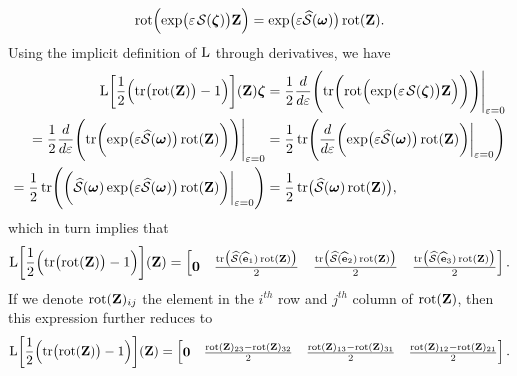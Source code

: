 \begin{align}
    \rot\Bigl(\exp\bigl(\varepsilon\SL[\boldsymbol{\zeta}]\bigr)\mathbf{Z}\Bigr) = \exp\bigl(\varepsilon\widehat{\mathcal{S}}(\boldsymbol{\omega})\bigr)\rot(\mathbf{Z}). 
\end{align}
Using the implicit definition of $\operatorname{L}$ through derivatives, we have
\begin{align}
   \begin{split}
     \Lop\biggl[\frac{1}{2}\Bigl(\tr\bigl(\rot(\mathbf{Z})\bigr)-1\Bigr)\biggr](\mathbf{Z})\boldsymbol{\zeta} &= \frac{1}{2}\frac{d}{d\varepsilon}\Biggl(\tr\biggl(\rot\Bigl(\exp\bigl(\varepsilon\SL[\boldsymbol{\zeta}]\bigr)\mathbf{Z}\Bigr)\biggr)\Biggr)\Biggr|_{\varepsilon=0}\\
     = \frac{1}{2}\frac{d}{d\varepsilon}\Biggl(\tr\biggl(\exp\bigl(\varepsilon\widehat{\mathcal{S}}(\boldsymbol{\omega})\bigr)\rot(\mathbf{Z})\biggr)\Biggr)\Biggr|_{\varepsilon=0}
     &= \frac{1}{2}\tr\Biggl(\frac{d}{d\varepsilon}\biggl(\exp\bigl(\varepsilon\widehat{\mathcal{S}}(\boldsymbol{\omega})\bigr)\rot(\mathbf{Z})\biggr)\biggr|_{\varepsilon=0}\Biggr)\\
     = \frac{1}{2}\tr\Biggl(\biggl(\widehat{\mathcal{S}}(\boldsymbol{\omega})\exp\bigl(\varepsilon\widehat{\mathcal{S}}(\boldsymbol{\omega})\bigr)\rot(\mathbf{Z})\biggr)\biggr|_{\varepsilon=0}\Biggr)
     &= \frac{1}{2}\tr\bigl(\widehat{\mathcal{S}}(\boldsymbol{\omega})\rot(\mathbf{Z})\bigr),
   \end{split}
\end{align}
which in turn implies that 
\begin{align}
    \operatorname{L}\biggl[\frac{1}{2}\Bigl(\operatorname{tr}\bigl(\operatorname{rot}(\mathbf{Z})\bigr)-1\Bigr)\biggr](\mathbf{Z}) = \begin{bmatrix}
        \mathbf{0}& \frac{\operatorname{tr}\bigl(\widehat{\mathcal{S}}(\widehat{\mathbf{e}}_1)\operatorname{rot}(\mathbf{Z})\bigr)}{2} & \frac{\operatorname{tr}\bigl(\widehat{\mathcal{S}}(\widehat{\mathbf{e}}_2)\operatorname{rot}(\mathbf{Z})\bigr)}{2} & \frac{\operatorname{tr}\bigl(\widehat{\mathcal{S}}(\widehat{\mathbf{e}}_3)\operatorname{rot}(\mathbf{Z})\bigr)}{2}
    \end{bmatrix}.
\end{align}
If we denote $\operatorname{rot}(\mathbf{Z})_{ij}$ the element in the $i^{th}$ row and $j^{th}$ column of $\operatorname{rot}(\mathbf{Z})$, then this expression further reduces to
\begin{align}
    \operatorname{L}\biggl[\frac{1}{2}\Bigl(\operatorname{tr}\bigl(\operatorname{rot}(\mathbf{Z})\bigr)-1\Bigr)\biggr](\mathbf{Z}) = \begin{bmatrix}
        \mathbf{0}& \frac{\operatorname{rot}(\mathbf{Z})_{23}-\operatorname{rot}(\mathbf{Z})_{32}}{2} & \frac{\operatorname{rot}(\mathbf{Z})_{13} - \operatorname{rot}(\mathbf{Z})_{31}}{2} & \frac{\operatorname{rot}(\mathbf{Z})_{12}-\operatorname{rot}(\mathbf{Z})_{21}}{2}
    \end{bmatrix}.
\end{align}

